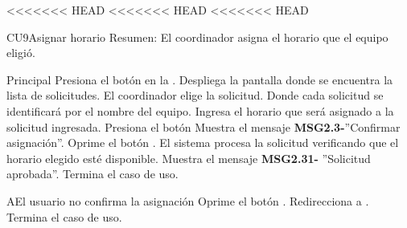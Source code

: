 <<<<<<< HEAD
<<<<<<< HEAD
<<<<<<< HEAD



	\begin{UseCase}{CU9}{Asignar horario}{
		Resumen: El coordinador asigna el horario que el equipo eligió.}
		
	\end{UseCase}
	\newpage
	
	
	\begin{UCtrayectoria}{Principal}
	\UCpaso[\UCactor] Presiona el botón  en la . 
	\UCpaso Despliega la pantalla  donde se encuentra la lista de solicitudes. 
	\UCpaso[\UCactor] El coordinador elige la solicitud. Donde cada solicitud se identificará por el nombre del equipo.
	\UCpaso[\UCactor] Ingresa el horario que será asignado a la solicitud ingresada.
	\UCpaso[\UCactor] Presiona el botón 
	\UCpaso Muestra el mensaje {\bf MSG2.3-}''Confirmar asignación''.
	\UCpaso[\UCactor] Oprime el botón .	
	\UCpaso El sistema procesa la solicitud verificando que el horario elegido esté disponible.
	\UCpaso Muestra el mensaje {\bf MSG2.31-} ''Solicitud aprobada''.  
	\UCpaso[] Termina el caso de uso.   
\end{UCtrayectoria}

\begin{UCtrayectoriaA}{A}{El usuario no confirma la asignación}
	\UCpaso[\UCactor] Oprime el botón .
	\UCpaso Redirecciona a .
	\UCpaso Termina el caso de uso.
	\end{UCtrayectoriaA}

